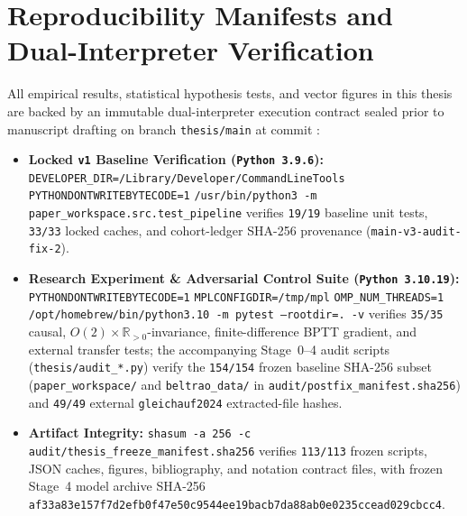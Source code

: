 \chapter{Reproducibility Manifests and Dual-Interpreter Verification}
\label{app:reproducibility}

All empirical results, statistical hypothesis tests, and vector figures in this thesis are backed
by an immutable dual-interpreter execution contract sealed prior to manuscript drafting on branch
\texttt{thesis/main} at commit \FrozenGitCommit{}:

\begin{itemize}\raggedright
  \item \textbf{Locked \texttt{v1} Baseline Verification (\texttt{Python 3.9.6}):}
    \texttt{DEVELOPER\_\allowbreak DIR=\allowbreak /Library/\allowbreak Developer/\allowbreak CommandLineTools}
    \texttt{PYTHONDONTWRITEBYTECODE=1}
    \texttt{/usr/\allowbreak bin/\allowbreak python3 -m paper\_\allowbreak workspace.\allowbreak src.\allowbreak test\_\allowbreak pipeline}
    verifies \texttt{19/19} baseline unit tests, \texttt{33/33} locked caches, and cohort-ledger
    SHA-256 provenance (\texttt{main-v3-audit-fix-2}).
  \item \textbf{Research Experiment \& Adversarial Control Suite (\texttt{Python 3.10.19}):}
    \texttt{PYTHONDONTWRITEBYTECODE=1} \texttt{MPLCONFIGDIR=/tmp/mpl} \texttt{OMP\_\allowbreak NUM\_\allowbreak THREADS=1}
    \texttt{/opt/\allowbreak homebrew/\allowbreak bin/\allowbreak python3.10 -m pytest --rootdir=. -v}
    verifies \texttt{35/35} causal, $O(2)\times\mathbb{R}_{>0}$-invariance, finite-difference BPTT gradient,
    and external transfer tests; the accompanying Stage~0--4 audit scripts (\texttt{thesis/\allowbreak audit\_*.py})
    verify the \texttt{154/154} frozen baseline SHA-256 subset (\texttt{paper\_\allowbreak workspace/}
    and \texttt{beltrao\_\allowbreak data/} in \texttt{audit/\allowbreak postfix\_\allowbreak manifest.sha256})
    and \texttt{49/49} external \texttt{gleichauf2024} extracted-file hashes.
  \item \textbf{Artifact Integrity:}
    \texttt{shasum -a 256 -c audit/\allowbreak thesis\_\allowbreak freeze\_\allowbreak manifest.sha256}
    verifies \texttt{113/113} frozen scripts, JSON caches, figures, bibliography, and notation contract
    files, with frozen Stage~4 model archive SHA-256
    \texttt{af33a83e\allowbreak 157f7d2e\allowbreak fb0f47e5\allowbreak 0c9544ee\allowbreak 19bacb7d\allowbreak a88ab0e0\allowbreak 235ccead\allowbreak 029cbcc4}.
\end{itemize}
